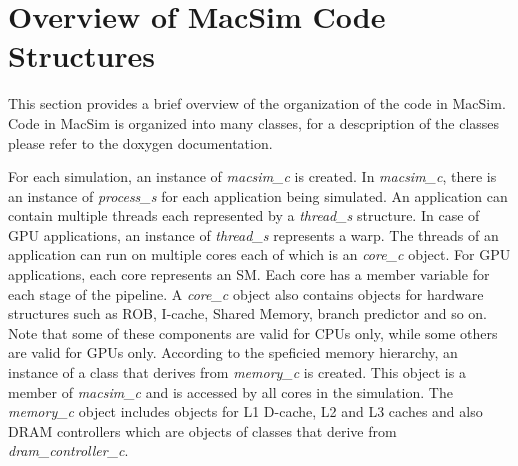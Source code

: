 
\chapter{Overview of MacSim Code Structures}
\label{sec:codetop}

This section provides a brief overview of the organization of the code in
MacSim. Code in MacSim is organized into many classes, for a descpription of
the classes please refer to the doxygen documentation.



For each simulation, an instance of \textit{macsim\_c} is created.  In
\textit{macsim\_c}, there is an instance of \textit{process\_s} for each
application being simulated. An application can contain multiple threads each
represented by a \textit{thread\_s} structure. In case of GPU applications, an
instance of \textit{thread\_s} represents a warp. The threads of an application
can run on multiple cores each of which is an \textit{core\_c} object. For GPU
applications, each core represents an SM. Each core has a member variable for
each stage of the pipeline.  A \textit{core\_c} object also contains objects
for hardware structures such as ROB, I-cache, Shared Memory, branch predictor
and so on. Note that some of these components are valid for CPUs only, while
some others are valid for GPUs only.  According to the speficied memory
hierarchy, an instance of a class that derives from \textit{memory\_c} is
created. This object is a member of \textit{macsim\_c} and is accessed by all
cores in the simulation. The \textit{memory\_c} object includes objects for L1
D-cache, L2 and L3 caches and also DRAM controllers which are objects of
classes that derive from \textit{dram\_controller\_c}. 


